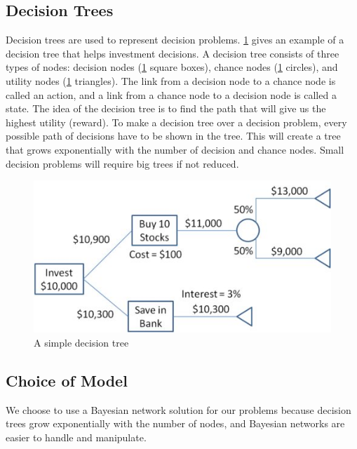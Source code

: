 \subsection{Decision Trees}
Decision trees are used to represent decision problems. \ref{fig:basicdecisiontree} gives an example of a decision tree that helps investment decisions. A decision tree consists of three types of nodes: decision nodes (\ref{fig:basicdecisiontree} square boxes), chance nodes (\ref{fig:basicdecisiontree} circles), and utility nodes (\ref{fig:basicdecisiontree} triangles). The link from a decision node to a chance node is called an action, and a link from a chance node to a decision node is called a state. The idea of the decision tree is to find the path that will give us the highest utility (reward). To make a decision tree over a decision problem, every possible path of decisions have to be shown in the tree. This will create a tree that grows exponentially with the number of decision and chance nodes. Small decision problems will require big trees if not reduced. 
	
\begin{figure}[H]
\includegraphics[scale=.5]{Figures/BayesianPictures/SimpleDecisionTree.png}
\caption{A simple decision tree \cite{sdt}}
\label{fig:basicdecisiontree}
\end{figure}

\subsection{Choice of Model}
We choose to use a Bayesian network solution for our problems because decision trees grow exponentially with the number of nodes, and 
Bayesian networks are easier to handle and manipulate.

